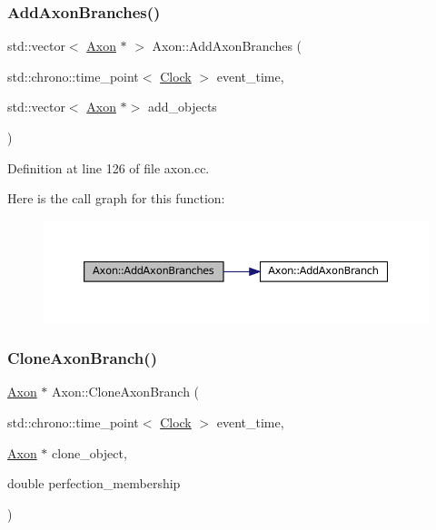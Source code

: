 \subsubsection{\texorpdfstring{Add\+Axon\+Branches()}{AddAxonBranches()}}
{\footnotesize\ttfamily std\+::vector$<$ \mbox{\hyperlink{class_axon}{Axon}} $\ast$ $>$ Axon\+::\+Add\+Axon\+Branches (\begin{DoxyParamCaption}\item[{std\+::chrono\+::time\+\_\+point$<$ \mbox{\hyperlink{universe_8h_a0ef8d951d1ca5ab3cfaf7ab4c7a6fd80}{Clock}} $>$}]{event\+\_\+time,  }\item[{std\+::vector$<$ \mbox{\hyperlink{class_axon}{Axon}} $\ast$$>$}]{add\+\_\+objects }\end{DoxyParamCaption})}



Definition at line 126 of file axon.\+cc.

Here is the call graph for this function\+:\nopagebreak
\begin{figure}[H]
\begin{center}
\leavevmode
\includegraphics[width=350pt]{class_axon_a04969d98c3fbb671cba5daccacffc003_cgraph}
\end{center}
\end{figure}
\mbox{\label{class_axon_a7720ee66a75e87f4e308b82d1841443a}} 
\subsubsection{\texorpdfstring{Clone\+Axon\+Branch()}{CloneAxonBranch()}}
{\footnotesize\ttfamily \mbox{\hyperlink{class_axon}{Axon}} $\ast$ Axon\+::\+Clone\+Axon\+Branch (\begin{DoxyParamCaption}\item[{std\+::chrono\+::time\+\_\+point$<$ \mbox{\hyperlink{universe_8h_a0ef8d951d1ca5ab3cfaf7ab4c7a6fd80}{Clock}} $>$}]{event\+\_\+time,  }\item[{\mbox{\hyperlink{class_axon}{Axon}} $\ast$}]{clone\+\_\+object,  }\item[{double}]{perfection\+\_\+membership }\end{DoxyParamCaption})}



